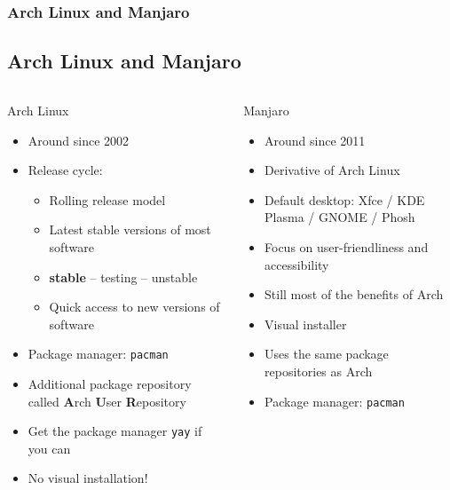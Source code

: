 \begin{frame}
	\frametitle{Arch Linux and Manjaro}
	\subsection{Arch Linux and Manjaro}
	
	\begin{columns}
		\begin{column}[t]{.45\linewidth}
			\begin{block}{Arch Linux}
				\begin{itemize}
					\item Around since 2002
					\item Release cycle:
						\begin{itemize}
							\item Rolling release model
							\item Latest stable versions of most software
							\item \textbf{stable} – testing – unstable
							\item Quick access to new versions of software
						\end{itemize}
					\item Package manager: \texttt{pacman}
					\item Additional package repository called \textbf{A}rch \textbf{U}ser \textbf{R}epository
					\item Get the package manager \texttt{yay} if you can
					\item No visual installation!
				\end{itemize}
			\end{block}
		\end{column}
		\hfill
		\begin{column}[t]{.45\linewidth}
			\begin{block}{Manjaro}
				\begin{itemize}
					\item Around since 2011
					\item Derivative of Arch Linux
					\item Default desktop: Xfce / KDE Plasma / GNOME / Phosh
					\item Focus on user-friendliness and accessibility
					\item Still most of the benefits of Arch
					\item Visual installer
					\item Uses the same package repositories as Arch
					\item Package manager: \texttt{pacman}
				\end{itemize}
			\end{block}
		\end{column}
	\end{columns}


\end{frame}
